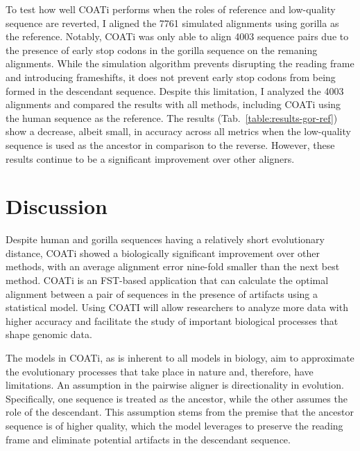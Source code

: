 To test how well COATi performs when the roles of reference and low-quality sequence are reverted, I aligned the 7761 simulated alignments using gorilla as the reference. Notably, COATi was only able to align 4003 sequence pairs due to the presence of early stop codons in the gorilla sequence on the remaning alignments. While the simulation algorithm prevents disrupting the reading frame and introducing frameshifts, it does not prevent early stop codons from being formed in the descendant sequence. Despite this limitation, I analyzed the 4003 alignments and compared the results with all methods, including COATi using the human sequence as the reference. The results (Tab.~\ref{table:results-gor-ref}) show a decrease, albeit small, in accuracy across all metrics when the low-quality sequence is used as the ancestor in comparison to the reverse. However, these results continue to be a significant improvement over other aligners.



\section{Discussion}

Despite human and gorilla sequences having a relatively short evolutionary distance, COATi showed a biologically significant improvement over other methods, with an average alignment error nine-fold smaller than the next best method. COATi is an FST-based application that can calculate the optimal alignment between a pair of sequences in the presence of artifacts using a statistical model. Using COATI will allow researchers to analyze more data with higher accuracy and facilitate the study of important biological processes that shape genomic data.

The models in COATi, as is inherent to all models in biology, aim to approximate the evolutionary processes that take place in nature and, therefore, have limitations. An assumption in the pairwise aligner is directionality in evolution. Specifically, one sequence is treated as the ancestor, while the other assumes the role of the descendant. This assumption stems from the premise that the ancestor sequence is of higher quality, which the model leverages to preserve the reading frame and eliminate potential artifacts in the descendant sequence.


